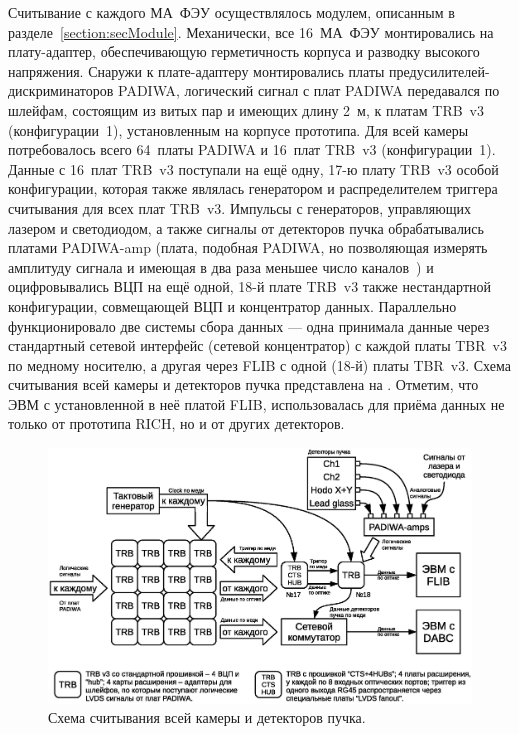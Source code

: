 Считывание с каждого МА~ФЭУ осуществлялось модулем, описанным в разделе~\ref{section:secModule}. Механически, все 16~МА~ФЭУ монтировались на плату-адаптер, обеспечивающую герметичность корпуса и разводку высокого напряжения. Снаружи к плате-адаптеру монтировались платы предусилителей-дискриминаторов PADIWA, логический сигнал с плат PADIWA передавался по шлейфам, состоящим из витых пар и имеющих длину 2~м, к платам TRB~v3 (конфигурации~1), установленным на корпусе прототипа. Для всей камеры потребовалось всего 64~платы PADIWA и 16~плат TRB~v3 (конфигурации~1). Данные с 16~плат TRB~v3 поступали на ещё одну, 17-ю плату TRB~v3 особой конфигурации, которая также являлась генератором и распределителем триггера считывания для всех плат TRB~v3. Импульсы с генераторов, управляющих лазером и светодиодом, а также сигналы от детекторов пучка обрабатывались платами PADIWA-amp (плата, подобная PADIWA, но позволяющая измерять амплитуду сигнала и имеющая в два раза меньшее число каналов~\cite{}) и оцифровывались ВЦП на ещё одной, 18-й плате TRB~v3 также нестандартной конфигурации, совмещающей ВЦП и концентратор данных. Параллельно функционировало две системы сбора данных --- одна принимала данные через стандартный сетевой интерфейс (сетевой концентратор) с каждой платы TBR~v3 по медному носителю, а другая через FLIB с одной (18-й) платы TBR~v3. Схема считывания всей камеры и детекторов пучка представлена на . Отметим, что ЭВМ с установленной в неё платой FLIB, использовалась для приёма данных не только от прототипа RICH, но и от других детекторов.

\begin{figure}[H]
\includegraphics[width=1.0\textwidth]{pictures/11_Beamtime_readout_chain.eps}
\caption{Схема считывания всей камеры и детекторов пучка.}
\label{fig:BeamtimeReadout}
\end{figure}
